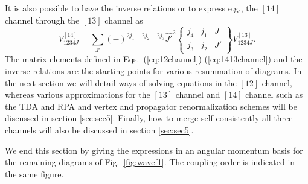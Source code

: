 \documentclass{article}
\begin{document}
It is also possible to have the inverse relations or to express
e.g., the $[14]$ channel through the $[13]$ channel as
\begin{equation}
       V_{1234J}^{[14]}=
      {\displaystyle \sum_{J'}}(-)^{2j_1+2j_2+2j_3}\hat{J'}^2
      \left\{
      \begin{array}{ccc}
       j_4&j_1&J\\j_3&j_2&J'
      \end{array}
       \right\}
       V_{1234J}^{[13]}.
       \label{eq:1413channel}
\end{equation}
The matrix elements defined in Eqs.\
(\ref{eq:12channel})-(\ref{eq:1413channel}) and the inverse relations
are the
starting points for various resummation of diagrams.
In the next section we will detail ways of solving equations
in the $[12]$ channel, whereas various approximations for the
$[13]$ channel and $[14]$ channel such as the TDA and RPA
and  vertex and propagator renormalization schemes
will be discussed in section \ref{sec:sec5}. Finally, how to
merge self-consistently  all three channels will also be discussed
in section \ref{sec:sec5}.

We end this section by giving the expressions in an angular momentum
basis for the remaining
diagrams of Fig.\ \ref{fig:wavef1}. The coupling order is indicated
in the same figure.
\end{document}
